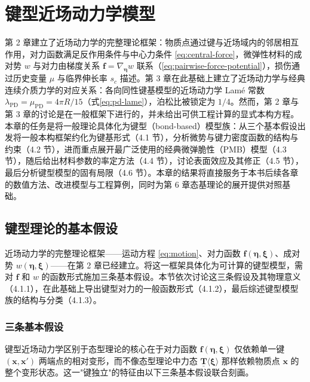 \chapter{键型近场动力学模型}

\leavevmode\usetikzlibrary{arrows.meta, positioning, calc}

第 2 章建立了近场动力学的完整理论框架：物质点通过键与近场域内的邻居相互作用，对力函数满足反作用条件与中心力条件 \eqref{eq:central-force}，微弹性材料的成对势 $w$ 与对力由梯度关系 $\mathbf{f}=\nabla_{\boldsymbol{\eta}}w$ 联系（\eqref{eq:pairwise-force-potential}），损伤通过历史变量 $\mu$ 与临界伸长率 $s_c$ 描述。第 3 章在此基础上建立了近场动力学与经典连续介质力学的对应关系：各向同性键基模型的近场动力学 Lam\'e 常数 $\lambda_{\mathrm{PD}}=\mu_{\mathrm{PD}}=4\pi R/15$（式\eqref{eq:pd-lame}），泊松比被锁定为 $1/4$。然而，第 2 章与第 3 章的讨论是在一般框架下进行的，并未给出可供工程计算的显式本构方程。本章的任务是将一般理论具体化为键型（bond-based）模型族：从三个基本假设出发将一般本构框架约化为键基形式（4.1 节），分析微势与键力密度函数的结构与约束（4.2 节），进而重点展开最广泛使用的经典微弹脆性（PMB）模型（4.3 节），随后给出材料参数的率定方法（4.4 节），讨论表面效应及其修正（4.5 节），最后分析键型模型的固有局限（4.6 节）。本章的结果将直接服务于本书后续各章的数值方法、改进模型与工程算例，同时为第 6 章态基理论的展开提供对照基础。

\section{键型理论的基本假设}

近场动力学的完整理论框架——运动方程 \eqref{eq:motion}、对力函数 $\mathbf{f}(\boldsymbol{\eta},\boldsymbol{\xi})$、成对势 $w(\boldsymbol{\eta},\boldsymbol{\xi})$——在第 2 章已经建立。将这一框架具体化为可计算的键型模型，需对 $\mathbf{f}$ 和 $w$ 的函数形式施加三条基本假设。本节依次讨论这三条假设及其物理意义（4.1.1），在此基础上导出键型对力的一般函数形式（4.1.2），最后综述键型模型族的结构与分类（4.1.3）。

\subsection{三条基本假设}

键型近场动力学区别于态型理论的核心在于对力函数 $\mathbf{f}(\boldsymbol{\eta},\boldsymbol{\xi})$ 仅依赖单一键 $(\mathbf{x},\mathbf{x}')$ 两端点的相对变形，而不像态型理论中力态 $\underline{\mathbf{T}}\langle\boldsymbol{\xi}\rangle$ 那样依赖物质点 $\mathbf{x}$ 的整个变形状态。这一"键独立"的特征由以下三条基本假设联合刻画。


